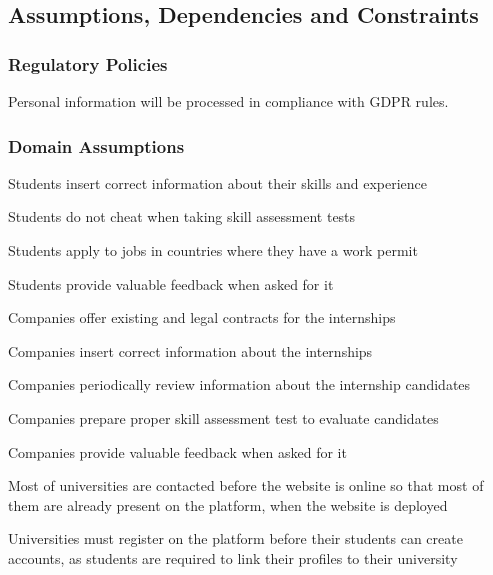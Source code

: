 \subsection{Assumptions, Dependencies and Constraints}
    \subsubsection{Regulatory Policies}
        Personal information will be processed in compliance with GDPR rules.
    
    \subsubsection{Domain Assumptions}
    \begin{enumerate}[label={[D\arabic*]}]
        \item {Students insert correct information about their skills and experience}
        \item {Students do not cheat when taking skill assessment tests}
        \item {Students apply to jobs in countries where they have a work permit}
        \item {Students provide valuable feedback when asked for it}
        \item {Companies offer existing and legal contracts for the internships}
        \item {Companies insert correct information about the internships}
        \item {Companies periodically review information about the internship candidates}
        \item {Companies prepare proper skill assessment test to evaluate candidates}
        \item {Companies provide valuable feedback when asked for it}
        \item {Most of universities are contacted before the website is online so that most of them are already present on the platform, when the website is deployed}
        \item {Universities must register on the platform before their students can create accounts, as students are required to link their profiles to their university}
    \end{enumerate}